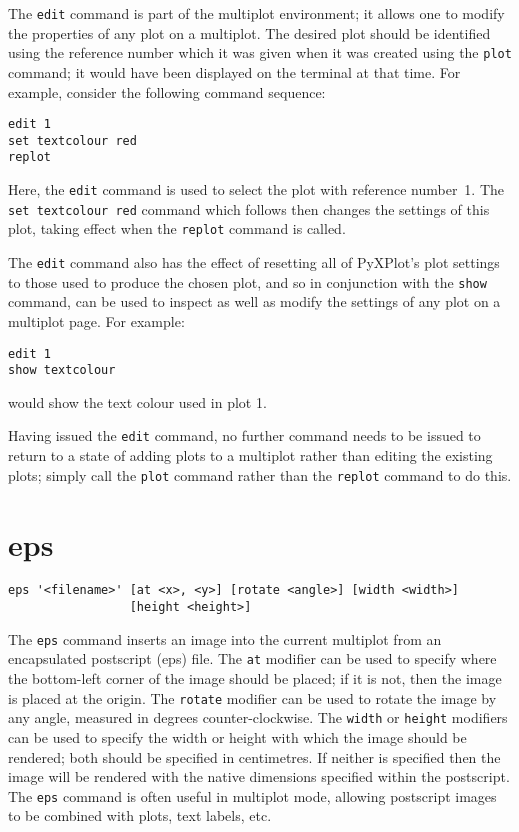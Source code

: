 The {\tt edit} command is part of the multiplot environment; it allows one to
modify the properties of any plot on a multiplot. The desired plot should be
identified using the reference number which it was given when it was created
using the {\tt plot} command; it would have been displayed on the terminal at
that time. For example, consider the following command sequence:

\begin{verbatim}
edit 1
set textcolour red
replot
\end{verbatim}

\noindent Here, the {\tt edit} command is used to select the plot with
reference number~1. The {\tt set textcolour red} command which follows then
changes the settings of this plot, taking effect when the {\tt replot} command
is called.

The {\tt edit} command also has the effect of resetting all of PyXPlot's plot
settings to those used to produce the chosen plot, and so in conjunction with
the {\tt show} command, can be used to inspect as well as modify the settings of
any plot on a multiplot page. For example:

\begin{verbatim}
edit 1
show textcolour
\end{verbatim}

\noindent would show the text colour used in plot 1.

Having issued the {\tt edit} command, no further command needs to be issued to
return to a state of adding plots to a multiplot rather than editing the
existing plots; simply call the {\tt plot} command rather than the {\tt replot}
command to do this.

\section{eps}

\begin{verbatim}
eps '<filename>' [at <x>, <y>] [rotate <angle>] [width <width>]
                 [height <height>]
\end{verbatim}

The {\tt eps} command inserts an image into the current multiplot from an
encapsulated postscript (eps) file.  The {\tt at} modifier can be used to
specify where the bottom-left corner of the image should be placed; if it is
not, then the image is placed at the origin. The {\tt rotate} modifier can be
used to rotate the image by any angle, measured in degrees counter-clockwise.
The {\tt width} or {\tt height} modifiers can be used to specify the width or
height with which the image should be rendered; both should be specified in
centimetres. If neither is specified then the image will be rendered with the
native dimensions specified within the postscript.  The {\tt eps} command is
often useful in multiplot mode, allowing postscript images to be combined with
plots, text labels, etc.


